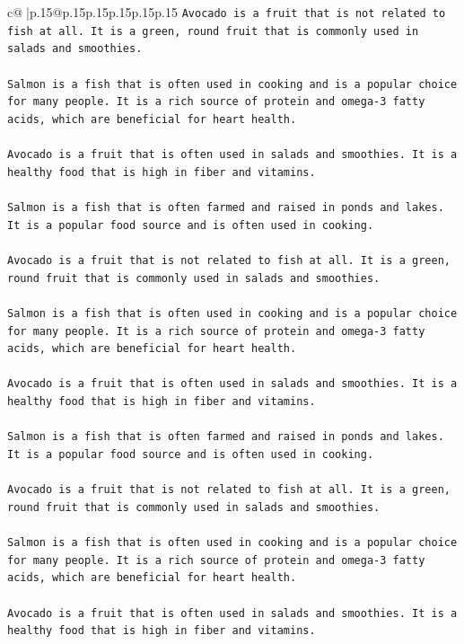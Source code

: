 \documentclass{article}
\begin{document}
{\begin{supertabular}{c@{$\;$}|p{.15\linewidth}@{}p{.15\linewidth}p{.15\linewidth}p{.15\linewidth}p{.15\linewidth}p{.15\linewidth}}
{{{\texttt{Avocado is a fruit that is not related to fish at all. It is a green, round fruit that is commonly used in salads and smoothies.} \\
\\ 
\texttt{Salmon is a fish that is often used in cooking and is a popular choice for many people. It is a rich source of protein and omega{-}3 fatty acids, which are beneficial for heart health.} \\
\\ 
\texttt{Avocado is a fruit that is often used in salads and smoothies. It is a healthy food that is high in fiber and vitamins.} \\
\\ 
\texttt{Salmon is a fish that is often farmed and raised in ponds and lakes. It is a popular food source and is often used in cooking.} \\
\\ 
\texttt{Avocado is a fruit that is not related to fish at all. It is a green, round fruit that is commonly used in salads and smoothies.} \\
\\ 
\texttt{Salmon is a fish that is often used in cooking and is a popular choice for many people. It is a rich source of protein and omega{-}3 fatty acids, which are beneficial for heart health.} \\
\\ 
\texttt{Avocado is a fruit that is often used in salads and smoothies. It is a healthy food that is high in fiber and vitamins.} \\
\\ 
\texttt{Salmon is a fish that is often farmed and raised in ponds and lakes. It is a popular food source and is often used in cooking.} \\
\\ 
\texttt{Avocado is a fruit that is not related to fish at all. It is a green, round fruit that is commonly used in salads and smoothies.} \\
\\ 
\texttt{Salmon is a fish that is often used in cooking and is a popular choice for many people. It is a rich source of protein and omega{-}3 fatty acids, which are beneficial for heart health.} \\
\\ 
\texttt{Avocado is a fruit that is often used in salads and smoothies. It is a healthy food that is high in fiber and vitamins.} \\
\\ 
}}}
\end{supertabular}}
\end{document}
